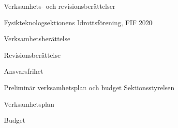 \documentclass[slutlig]{sektionsmote}
\begin{document}
\begin{ootd}
\item{Verksamhets- och revisionsberättelser}
\begin{ootd}
    \item Fysikteknologsektionens Idrottsförening, FIF 2020
    \begin{ootd}
        \item Verksamhetsberättelse
        \item Revisionsberättelse
        \item Ansvarsfrihet
    \end{ootd}
\end{ootd}

\item{Preliminär verksamhetsplan och budget Sektionsstyrelsen}
\begin{ootd}
    \item Verksamhetsplan
    \item Budget
\end{ootd}



\end{ootd}
\end{document}
